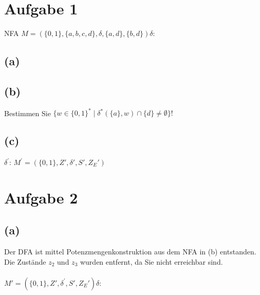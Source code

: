 \documentclass[titlepage]{article}
\renewcommand{\]}{\right]}
\renewcommand{\[}{\left[}
\renewcommand{\)}{\right)}
\renewcommand{\(}{\left(}
\renewcommand{\|}{\;|\;}
\renewcommand{\l}{\linebreak}
\begin{document}
\begingroup\let\clearpage\relax
	
	
	\section*{Aufgabe 1}
		\tab NFA $M=(\{0,1\},\{a,b,c,d\},\delta,\{a,d\},\{b,d\})$\tab$\delta$:\l
		\begin{center}
			
			
		\end{center}
	
		\subsection*{(a)}
			
			
			
		\subsection*{(b)}Bestimmen Sie $\{w\in\{0,1\}^*\mid\delta^*(\{a\},w)\cap\{d\}\neq\emptyset\}!$
			
			
		\subsection*{(c)}
		\begin{center}
			
			
			$\delta^{'}$:\l
			\l
			$M^{'}=(\{0,1\},Z',\delta',S',Z_E')$
		\end{center}
	\section*{Aufgabe 2}
	\subsection*{(a)}
		Der DFA ist mittel Potenzmengenkonstruktion aus dem NFA in (b) entstanden. Die Zustände $z_2$ und $z_3$ wurden entfernt, da Sie nicht erreichbar sind. \\\\
		\tab$M'=(\{0,1\},Z',\delta^{'},S',Z_E')$\tab$\delta$:\\
		\begin{center}
			
			
		\end{center}
		
\end{document}
